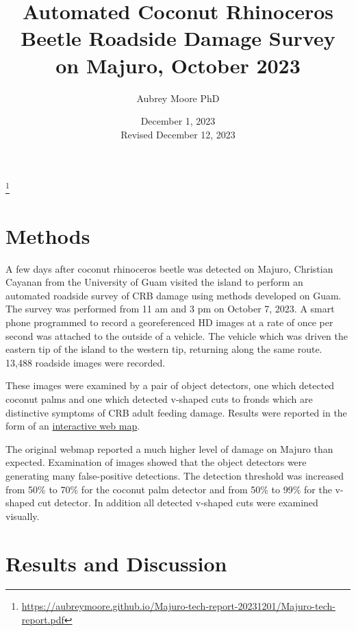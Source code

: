 \documentclass[12pt,letterpaper,english,bibliography=totocnumbered, abstract=on]{scrartcl}
\begin{document}
\titlehead{DRAFT TECHNICAL REPORT}

\title{Automated Coconut Rhinoceros Beetle Roadside Damage Survey on Majuro, October 2023}

\author{Aubrey Moore PhD}

\date{December 1, 2023\\Revised December 12, 2023}

\maketitle

\footnote{\url{https://aubreymoore.github.io/Majuro-tech-report-20231201/Majuro-tech-report.pdf}}


\pagebreak

\section{Methods}

A few days after coconut rhinoceros beetle was detected on Majuro, Christian Cayanan from the University of Guam visited the island to perform an automated roadside survey of CRB damage using methods developed on Guam. The survey was performed from 11 am and 3 pm on October 7, 2023. A smart phone programmed to record a georeferenced HD images at a rate of once per second was attached to the outside of a vehicle. The vehicle which was driven the eastern tip of the island to the western tip, returning along the same route. 13,488 roadside images were recorded.

These images were examined by a pair of object detectors, one which detected coconut palms and one which detected v-shaped cuts to fronds which are distinctive symptoms of CRB adult feeding damage. Results were reported in the form of an \href{https://aubreymoore.github.io/Majuro-CRB-Damage-Map-2023-10/webmap/#12/7.1098/171.2099}{interactive web map}. 

The original webmap reported a much higher level of damage on Majuro than expected. Examination of images showed that the object detectors were generating many false-positive detections. The detection threshold was increased from 50\% to 70\% for the coconut palm detector and from 50\% to 99\% for the v-shaped cut detector. In addition all detected v-shaped cuts were examined visually.

\section{Results and Discussion}
\end{document}
